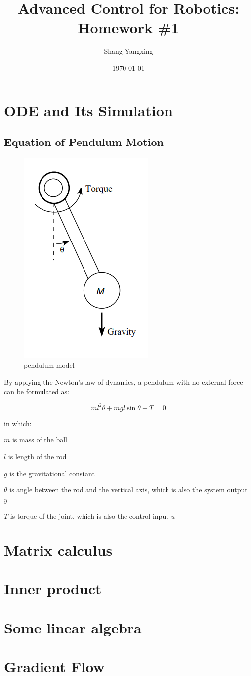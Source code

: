 \documentclass[titlepage]{article}
\title{\textbf{Advanced Control for Robotics: Homework \#1}}
\author{Shang Yangxing}
\date{\today}
\begin{document}
\maketitle

\section{ODE and Its Simulation}

\subsection{Equation of Pendulum Motion}

\begin{figure}[htbp]
    \centering
    \includegraphics[width=.3\textwidth]{img/pendulum.png}
    \caption{pendulum model}
    \label{fig:pendulum}
\end{figure}

By applying the Newton's law of dynamics, a pendulum with no external force can be formulated as:

\begin{equation}
    ml^2 \ddot{\theta} + mgl \sin{\theta} - T = 0
\end{equation}

in which:

\quad $m$ is mass of the ball

\quad $l$ is length of the rod

\quad $g$ is the gravitational constant

\quad $\theta$ is angle between the rod and the vertical axis, which is also the system output $y$

\quad $T$ is torque of the joint, which is also the control input $u$



\section{Matrix calculus}
\section{Inner product}
\section{Some linear algebra}
\section{Gradient Flow}
\end{document}
